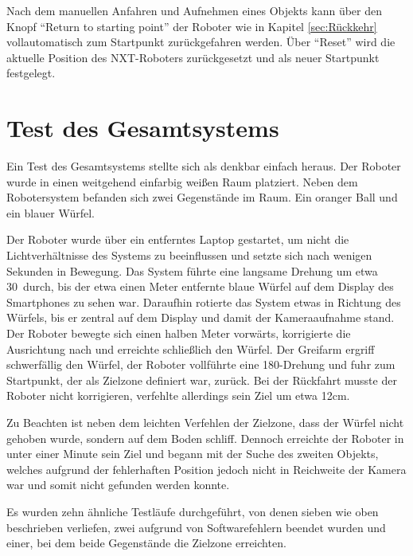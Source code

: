 Nach dem manuellen Anfahren und Aufnehmen eines Objekts kann über den Knopf \enquote{Return to starting point} der Roboter wie in Kapitel \ref{sec:Rückkehr} vollautomatisch zum Startpunkt zurückgefahren werden. Über \enquote{Reset} wird die aktuelle Position des NXT-Roboters zurückgesetzt und als neuer Startpunkt festgelegt.

\section{Test des Gesamtsystems}

Ein Test des Gesamtsystems stellte sich als denkbar einfach heraus. Der Roboter wurde in einen weitgehend einfarbig weißen Raum platziert. Neben dem Robotersystem befanden sich zwei Gegenstände im Raum. Ein oranger Ball und ein blauer Würfel.

Der Roboter wurde über ein entferntes Laptop gestartet, um nicht die Lichtverhältnisse des Systems zu beeinflussen und setzte sich nach wenigen Sekunden in Bewegung. Das System führte eine langsame Drehung um etwa 30\degree\ durch, bis der etwa einen Meter entfernte blaue Würfel auf dem Display des Smartphones zu sehen war. Daraufhin rotierte das System etwas in Richtung des Würfels, bis er zentral auf dem Display und damit der Kameraaufnahme stand. Der Roboter bewegte sich einen halben Meter vorwärts, korrigierte die Ausrichtung nach und erreichte schließlich den Würfel. Der Greifarm ergriff schwerfällig den Würfel, der Roboter vollführte eine 180\degree-Drehung und fuhr zum Startpunkt, der als Zielzone definiert war, zurück. Bei der Rückfahrt musste der Roboter nicht korrigieren, verfehlte allerdings sein Ziel um etwa 12cm. 

Zu Beachten ist neben dem leichten Verfehlen der Zielzone, dass der Würfel nicht gehoben wurde, sondern auf dem Boden schliff. Dennoch erreichte der Roboter in unter einer Minute sein Ziel und begann mit der Suche des zweiten Objekts, welches aufgrund der fehlerhaften Position jedoch nicht in Reichweite der Kamera war und somit nicht gefunden werden konnte.

Es wurden zehn ähnliche Testläufe durchgeführt, von denen sieben wie oben beschrieben verliefen, zwei aufgrund von Softwarefehlern beendet wurden und einer, bei dem beide Gegenstände die Zielzone erreichten.